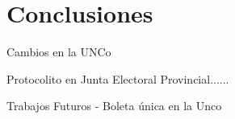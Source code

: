 \label{conclusiones}
\chapter{Conclusiones}

Cambios en la UNCo

Protocolito en Junta Electoral Provincial......


Trabajos Futuros - Boleta única en la Unco


